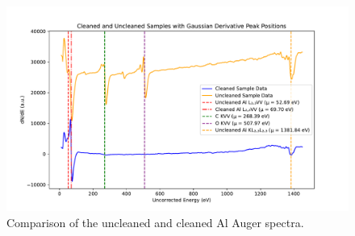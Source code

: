 \documentclass[12pt]{article}
\begin{document}
\begin{figure}
  \includegraphics[width=\linewidth]{clean_dirty.pdf}
  \caption{Comparison of the uncleaned and cleaned Al Auger spectra.}
  \label{clean_dirty}
\end{figure}
\end{document}
